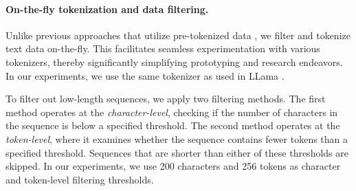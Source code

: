 \documentclass[10pt,twocolumn,letterpaper]{article}
\makeatletter
\newcommand{\model}{OpenELM\@\xspace}
\makeatother
\begin{document}
\paragraph{On-the-fly tokenization and data filtering.} Unlike previous approaches that utilize pre-tokenized data \cite{biderman2023pythia,groeneveld2024olmo}, we filter and tokenize text data on-the-fly. This facilitates seamless experimentation with various tokenizers, thereby significantly simplifying prototyping and research endeavors. In our experiments, we use the same tokenizer as used in LLama \cite{touvron2023llama}.

To filter out low-length sequences, we apply two filtering methods. The first method operates at the \emph{character-level}, checking if the number of characters in the sequence is below a specified threshold. The second method operates at the \emph{token-level}, where it examines whether the sequence contains fewer tokens than a specified threshold. Sequences that are shorter than either of these thresholds are skipped. In our experiments, we use 200 characters and 256 tokens as character and token-level filtering thresholds.

\begin{table}[b!]
    \centering
    \caption{Dataset used for pre-training \model.}
    \label{tab:dataset_mix_pretrainig}
\end{table}
\end{document}
